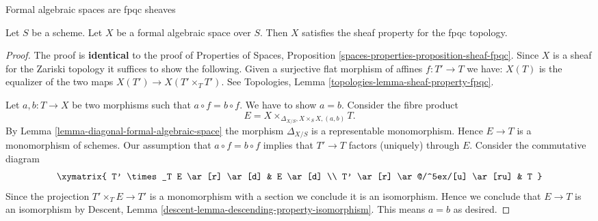 %
\begin{lemma}
\label{lemma-sheaf-fpqc}
\begin{slogan}
Formal algebraic spaces are fpqc sheaves
\end{slogan}
Let $S$ be a scheme. Let $X$ be a formal algebraic space over $S$. Then
$X$ satisfies the sheaf property for the fpqc topology.
\end{lemma}

\begin{proof}
The proof is {\bf identical} to the proof of
Properties of Spaces, Proposition
\ref{spaces-properties-proposition-sheaf-fpqc}.
Since $X$ is a sheaf for the Zariski topology it
suffices to show the following. Given a surjective
flat morphism of affines $f : T' \to T$ we have:
$X(T)$ is the equalizer of the two maps $X(T') \to X(T' \times_T T')$.
See Topologies, Lemma \ref{topologies-lemma-sheaf-property-fpqc}.

\medskip\noindent
Let $a, b : T \to X$ be two morphisms such that $a \circ f = b \circ f$.
We have to show $a = b$. Consider the fibre product
$$
E = X \times_{\Delta_{X/S}, X \times_S X, (a, b)} T.
$$
By Lemma \ref{lemma-diagonal-formal-algebraic-space}
the morphism $\Delta_{X/S}$ is a representable monomorphism. Hence
$E \to T$ is a monomorphism of schemes. Our assumption that
$a \circ f = b \circ f$ implies that $T' \to T$ factors (uniquely) through $E$.
Consider the commutative diagram
$$
\xymatrix{
T' \times_T E \ar[r] \ar[d] & E \ar[d] \\
T' \ar[r] \ar@/^5ex/[u] \ar[ru] & T
}
$$
Since the projection $T' \times_T E \to T'$ is a monomorphism
with a section we conclude it is an isomorphism. Hence we conclude that
$E \to T$ is an isomorphism by
Descent, Lemma \ref{descent-lemma-descending-property-isomorphism}.
This means $a = b$ as desired.


\end{proof}
